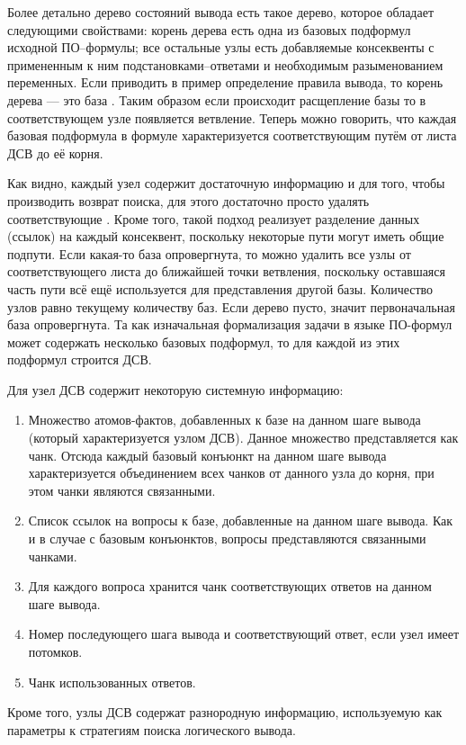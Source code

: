 Более детально дерево состояний вывода есть такое дерево, которое обладает следующими свойствами: корень дерева есть одна из базовых подформул исходной ПО--формулы; все остальные узлы есть добавляемые консеквенты с примененным к ним подстановками--ответами и необходимым разыменованием переменных. Если приводить в пример определение правила вывода, то корень дерева --- это база . Таким образом если происходит расщепление базы то в соответствующем узле появляется ветвление. Теперь можно говорить, что каждая базовая подформула в формуле характеризуется соответствующим путём от листа ДСВ до её корня.

Как видно, каждый узел содержит достаточную информацию и для того, чтобы производить возврат поиска, для этого достаточно просто удалять соответствующие . Кроме того, такой подход реализует разделение данных (ссылок) на каждый консеквент, поскольку некоторые пути могут иметь общие подпути. Если какая-то база опровергнута, то можно удалить все узлы от соответствующего листа до ближайшей точки ветвления, поскольку оставшаяся часть пути всё ещё используется для представления другой базы. Количество  узлов равно текущему количеству баз. Если дерево пусто, значит первоначальная база опровергнута. Та как изначальная формализация задачи в языке ПО-формул может содержать несколько базовых подформул, то для каждой из этих подформул строится  ДСВ.

Для  узел ДСВ содержит некоторую системную информацию:
\begin{enumerate}
\item Множество атомов-фактов, добавленных к базе на данном шаге вывода (который характеризуется узлом ДСВ). Данное множество представляется как чанк. Отсюда каждый базовый конъюнкт на данном шаге вывода характеризуется объединением всех чанков от данного узла до корня, при этом чанки являются связанными.
\item Список ссылок на вопросы к базе, добавленные на данном шаге вывода. Как и в случае с базовым конъюнктов, вопросы представляются связанными чанками.
\item Для каждого вопроса хранится чанк соответствующих ответов на данном шаге вывода.
\item Номер последующего шага вывода и соответствующий ответ, если узел имеет потомков.
\item Чанк использованных ответов.
\end{enumerate}
Кроме того, узлы ДСВ содержат разнородную информацию, используемую как параметры к стратегиям поиска логического вывода.

